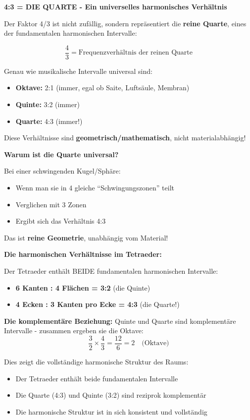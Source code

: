 \documentclass[12pt,a4paper]{article}
\theoremstyle{definition}
\begin{document}
\textbf{4:3 = DIE QUARTE - Ein universelles harmonisches Verh\"altnis}

Der Faktor 4/3 ist nicht zuf\"allig, sondern repr\"asentiert die \textbf{reine Quarte}, eines der fundamentalen harmonischen Intervalle:

\begin{equation}
	\frac{4}{3} = \text{Frequenzverh\"altnis der reinen Quarte}
\end{equation}

Genau wie musikalische Intervalle universal sind:
\begin{itemize}
	\item \textbf{Oktave:} 2:1 (immer, egal ob Saite, Lufts\"aule, Membran)
	\item \textbf{Quinte:} 3:2 (immer)
	\item \textbf{Quarte:} 4:3 (immer!)
\end{itemize}

Diese Verh\"altnisse sind \textbf{geometrisch/mathematisch}, nicht materialabh\"angig!

\textbf{Warum ist die Quarte universal?}

Bei einer schwingenden Kugel/Sph\"are:
\begin{itemize}
	\item Wenn man sie in 4 gleiche ``Schwingungszonen'' teilt
	\item Verglichen mit 3 Zonen
	\item Ergibt sich das Verh\"altnis 4:3
\end{itemize}

Das ist \textbf{reine Geometrie}, unabh\"angig vom Material!

\textbf{Die harmonischen Verh\"altnisse im Tetraeder:}

Der Tetraeder enth\"alt BEIDE fundamentalen harmonischen Intervalle:
\begin{itemize}
	\item \textbf{6 Kanten : 4 Fl\"achen = 3:2} (die Quinte)
	\item \textbf{4 Ecken : 3 Kanten pro Ecke = 4:3} (die Quarte!)
\end{itemize}

\textbf{Die komplement\"are Beziehung:}
Quinte und Quarte sind komplement\"are Intervalle - zusammen ergeben sie die Oktave:
\begin{equation}
	\frac{3}{2} \times \frac{4}{3} = \frac{12}{6} = 2 \quad \text{(Oktave)}
\end{equation}

Dies zeigt die vollst\"andige harmonische Struktur des Raums:
\begin{itemize}
	\item Der Tetraeder enth\"alt beide fundamentalen Intervalle
	\item Die Quarte (4:3) und Quinte (3:2) sind reziprok komplement\"ar
	\item Die harmonische Struktur ist in sich konsistent und vollst\"andig
\end{itemize}
\end{document}
